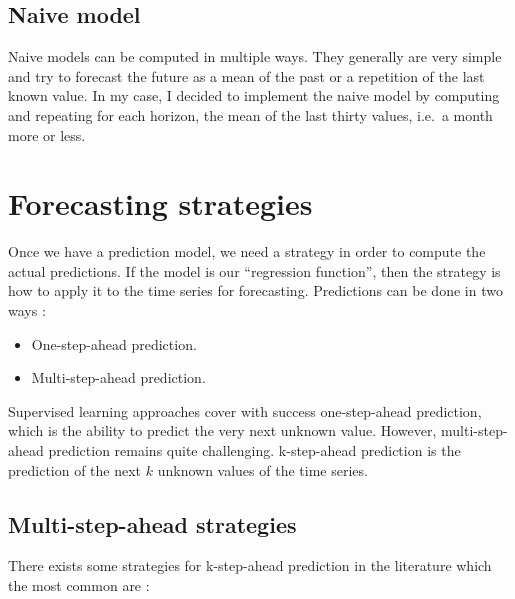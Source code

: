 \documentclass[11pt,a4paper,oneside]{book}
\newenvironment{myitemize}
{ \begin{itemize}
    \setlength\itemsep{0pt}}
{ \end{itemize}                  }
\begin{document}
\subsection{Naive model}

Naive models can be computed in multiple ways. They generally are very simple and try to forecast the future as a mean of the past or a repetition of the last known value. In my case, I decided to implement the naive model by computing and repeating for each horizon, the mean of the last thirty values, i.e.\ a month more or less. 




\section{Forecasting strategies}\label{strat}

Once we have a prediction model, we need a strategy in order to compute the actual predictions. If the model is our ``regression function'', then the strategy is how to apply it to the time series for forecasting. Predictions can be done in two ways :

\begin{myitemize}
    \item One-step-ahead prediction.
    \item Multi-step-ahead prediction.
\end{myitemize}

Supervised learning approaches cover with success one-step-ahead prediction, which is the ability to predict the very next unknown value. However, multi-step-ahead prediction remains quite challenging.  k-step-ahead prediction is the prediction of the next $k$ unknown values of the time series. 

\subsection{Multi-step-ahead strategies}

There exists some strategies for k-step-ahead prediction in the literature which the most common are \cite{Bonte}\cite{taiebonte}:
\end{document}
